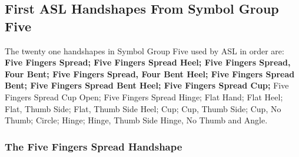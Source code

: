 \documentclass{article}
\begin{document}
\subsection{First ASL Handshapes From Symbol Group Five}

The twenty one handshapes in Symbol Group Five used by ASL in order are:
{\bf
Five Fingers Spread;
Five Fingers Spread Heel;
Five Fingers Spread, Four Bent;
Five Fingers Spread, Four Bent Heel;
Five Fingers Spread Bent;
Five Fingers Spread Bent Heel;
Five Fingers Spread Cup;
}
Five Fingers Spread Cup Open;
Five Fingers Spread Hinge;
Flat Hand;
Flat Heel;
Flat, Thumb Side;
Flat, Thumb Side Heel;
Cup;
Cup, Thumb Side;
Cup, No Thumb;
Circle;
Hinge;
Hinge, Thumb Side
Hinge, No Thumb
and Angle.

\subsubsection{The Five Fingers Spread Handshape}
\end{document}

